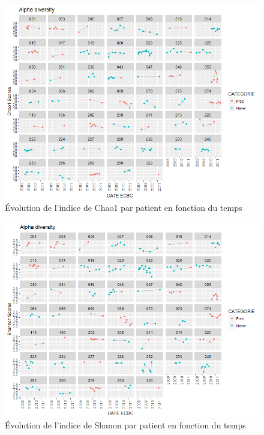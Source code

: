 \documentclass[12pt,a4paper]{article}
\begin{document}
\begin{figure}
\begin{center}
\includegraphics[scale=0.80]{img/alpha_chao1.png}\hfill
\end{center}
\caption{Évolution de l'indice de Chao1 par patient en fonction du temps}
\label{alphaChao1}
\end{figure}

\begin{figure}
\begin{center}
\includegraphics[scale=0.80]{img/alpha_shannon.png}\hfill
\end{center}
\caption{Évolution de l'indice de Shanon par patient en fonction du temps}
\label{alphaShannon}
\end{figure}
\end{document}

